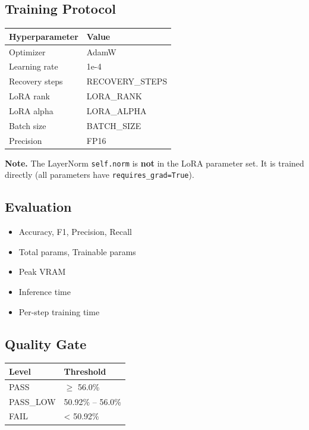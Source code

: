 \subsection{Training Protocol}

\begin{table}[H]
\centering
\small
\begin{tabular}{ll}
\toprule
\textbf{Hyperparameter} & \textbf{Value} \\
\midrule
Optimizer & AdamW \\
Learning rate & 1e-4 \\
Recovery steps & {{RECOVERY\_STEPS}} \\
LoRA rank & {{LORA\_RANK}} \\
LoRA alpha & {{LORA\_ALPHA}} \\
Batch size & {{BATCH\_SIZE}} \\
Precision & FP16 \\
\bottomrule
\end{tabular}
\end{table}

\textbf{Note.} The LayerNorm \texttt{self.norm} is \textbf{not} in the LoRA parameter set. 
It is trained directly (all parameters have \texttt{requires\_grad=True}).

\subsection{Evaluation}

\begin{itemize}
\item Accuracy, F1, Precision, Recall
\item Total params, Trainable params
\item Peak VRAM
\item Inference time
\item Per-step training time

\end{itemize}
\subsection{Quality Gate}

\begin{table}[H]
\centering
\small
\begin{tabular}{ll}
\toprule
\textbf{Level} & \textbf{Threshold} \\
\midrule
PASS & $\ge$ 56.0\% \\
PASS\_LOW & 50.92\% -- 56.0\% \\
FAIL & < 50.92\% \\
\bottomrule
\end{tabular}
\end{table}

